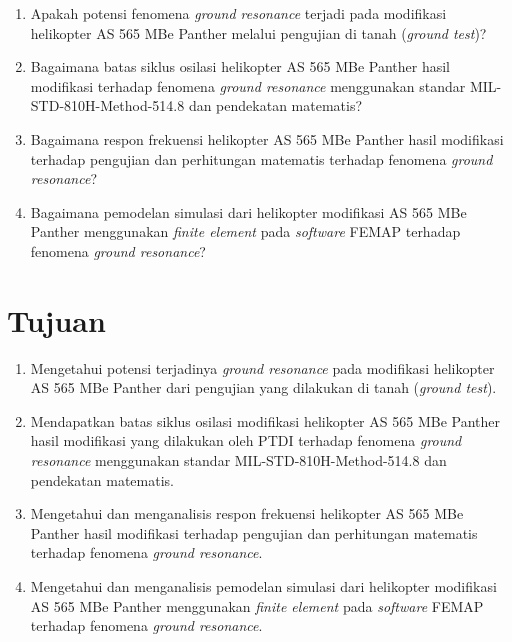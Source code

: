 \begin{enumerate}[nolistsep]
	
	\item Apakah potensi fenomena \textit{ground resonance} terjadi pada modifikasi helikopter AS 565 MBe Panther melalui pengujian di tanah (\textit{ground test})?
	
	\item Bagaimana batas siklus osilasi helikopter AS 565 MBe Panther hasil modifikasi terhadap fenomena \textit{ground resonance} menggunakan standar MIL-STD-810H-Method-514.8 dan pendekatan matematis?
	
	\item Bagaimana respon frekuensi helikopter AS 565 MBe Panther hasil modifikasi terhadap pengujian dan perhitungan matematis terhadap fenomena \textit{ground resonance}?
	
	\item Bagaimana pemodelan simulasi dari helikopter modifikasi AS 565 MBe Panther menggunakan \textit{finite element} pada \textit{software} FEMAP terhadap fenomena \textit{ground resonance}? 
\end{enumerate}

\section{Tujuan}
\label{sec:Tujuan}

\begin{enumerate}[nolistsep]

	\item Mengetahui potensi terjadinya \textit{ground resonance} pada modifikasi helikopter AS 565 MBe Panther dari pengujian yang dilakukan di tanah (\textit{ground test}).
	
	\item Mendapatkan batas siklus osilasi modifikasi helikopter AS 565 MBe Panther hasil modifikasi yang dilakukan oleh PTDI terhadap fenomena \textit{ground resonance} menggunakan standar MIL-STD-810H-Method-514.8 dan pendekatan matematis.
	
	\item Mengetahui dan menganalisis  respon frekuensi helikopter AS 565 MBe Panther hasil modifikasi terhadap pengujian dan perhitungan matematis terhadap fenomena \textit{ground resonance}.
	
	\item Mengetahui dan menganalisis pemodelan simulasi dari helikopter modifikasi AS 565 MBe Panther menggunakan \textit{finite element} pada \textit{software} FEMAP terhadap fenomena \textit{ground resonance}.
\end{enumerate}

